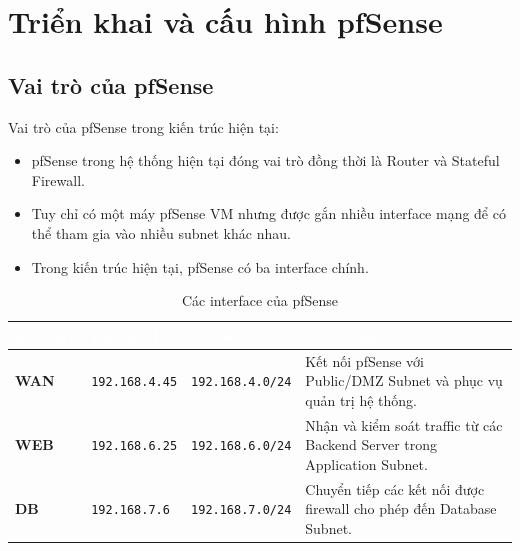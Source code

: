 \documentclass[12pt, a4paper]{article}
\begin{document}
\section{Triển khai và cấu hình pfSense}

\subsection{Vai trò của pfSense}

Vai trò của pfSense trong kiến trúc hiện tại:

\begin{itemize}

\item pfSense trong hệ thống hiện tại đóng vai trò đồng thời là Router và Stateful Firewall.

\item Tuy chỉ có một máy pfSense VM nhưng được gắn nhiều interface mạng để có thể tham gia vào nhiều subnet khác nhau.

\item Trong kiến trúc hiện tại, pfSense có ba interface chính.

\end{itemize}

\begin{table}[H]
    \centering
    \caption{Các interface của pfSense}
    \label{tab:pfsense-interface}

    \renewcommand{\arraystretch}{1.4}
    \setlength{\tabcolsep}{8pt}

    \begin{tabularx}{\textwidth}{
        >{\centering\arraybackslash}p{2.5cm}
        >{\centering\arraybackslash}p{3.2cm}
        >{\centering\arraybackslash}p{3.5cm}
        >{\raggedright\arraybackslash}X
    }
        \toprule

        \rowcolor{CMCBlue}
        \textcolor{white}{\textbf{Interface}} &
        \textcolor{white}{\textbf{Địa chỉ IP}} &
        \textcolor{white}{\textbf{Subnet}} &
        \textcolor{white}{\textbf{Chức năng}} \\

        \midrule

        \rowcolor{LightBlue}
        \textbf{WAN} &
        \texttt{192.168.4.45} &
        \texttt{192.168.4.0/24} &
        Kết nối pfSense với Public/DMZ Subnet và phục vụ quản trị hệ thống. \\

        \textbf{WEB} &
        \texttt{192.168.6.25} &
        \texttt{192.168.6.0/24} &
        Nhận và kiểm soát traffic từ các Backend Server trong Application Subnet. \\

        \rowcolor{LightBlue}
        \textbf{DB} &
        \texttt{192.168.7.6} &
        \texttt{192.168.7.0/24} &
        Chuyển tiếp các kết nối được firewall cho phép đến Database Subnet. \\

        \bottomrule
    \end{tabularx}
\end{table}
\end{document}

